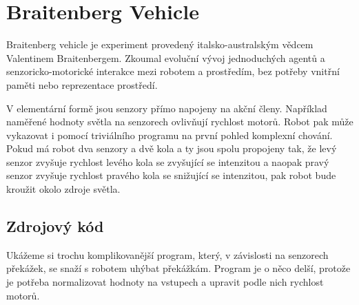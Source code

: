 \documentclass[12pt,notitlepage]{report}
\begin{document}
\section{Braitenberg Vehicle}
\label{braitenberg vehicle}

Braitenberg vehicle je experiment provedený italsko-australským vědcem
Valentinem Braitenbergem. Zkoumal evoluční vývoj jednoduchých agentů a
senzoricko-motorické interakce mezi robotem a prostředím, bez potřeby vnitřní
paměti nebo reprezentace prostředí.

V elementární formě jsou senzory přímo napojeny na akční členy. Například
naměřené hodnoty světla na senzorech ovlivňují rychlost motorů. Robot pak může
vykazovat i pomocí triviálního programu na první pohled komplexní chování.
Pokud má robot dva senzory a dvě kola a ty jsou spolu propojeny tak, že levý
senzor zvyšuje rychlost levého kola se zvyšující se intenzitou a naopak pravý
senzor zvyšuje rychlost pravého kola se snižující se intenzitou, pak robot bude
kroužit okolo zdroje světla.

\subsection{Zdrojový kód}

Ukážeme si trochu komplikovanější program, který, v závislosti na senzorech
překážek, se snaží s robotem uhýbat překážkám. Program je o něco delší, protože
je potřeba normalizovat hodnoty na vstupech a upravit podle nich rychlost
motorů.
\end{document}
